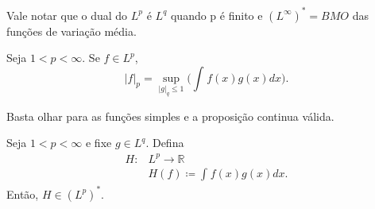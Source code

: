 \documentclass[MeasureTheory/measure_theory.tex]{subfiles}
\begin{document}
Vale notar que o dual do \(L^{p}\) é \(L^{q}\) quando p é finito e \((L^{\infty})^{*} = BMO\) das funções de variação média.
\begin{theorem*}
	Seja \(1< p < \infty\). Se \(f\in L^{p}\),
	\[
		|f|_{p}=\sup_{|g|_{q}\leq 1}\biggl(\int_{}^{}f(x)g(x)dx\biggr).
	\]
\end{theorem*}
\begin{crl*}
	Basta olhar para as funções simples e a proposição continua válida.
\end{crl*}
\begin{prop*}
	Seja \(1 < p < \infty\) e fixe \(g\in L^{q}\). Defina
	\begin{align*}
		H: & L^{p}\rightarrow \mathbb{R}         \\
		   & H(f)\coloneqq \int_{}^{}f(x)g(x)dx.
	\end{align*}
	Então, \(H\in (L^{p})^{*}.\)
\end{prop*}
\end{document}
